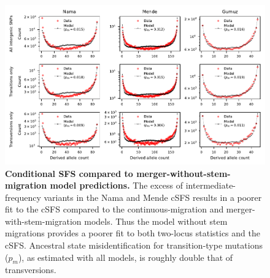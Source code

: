 \documentclass[]{article}
\begin{document}
\begin{figure}[ht]
    \centering
    \includegraphics{figures/supp-csfs-merger-without-stem-migration.pdf}
    \caption{
        \textbf{Conditional SFS compared to merger-without-stem-migration model predictions.}
        The excess of intermediate-frequency variants in the Nama and Mende
        cSFS results in a poorer fit to the cSFS compared to the continuous-migration
        and merger-with-stem-migration models. Thus the model without stem migrations
        provides a poorer fit 
        to both two-locus statistics and the cSFS.
        Ancestral state misidentification for transition-type mutations ($p_m$), as estimated
        with all models, is roughly double that of transversions.
    }
    \label{fig:supp-csfs-merger-without-stem-migration}
\end{figure}
\end{document}
